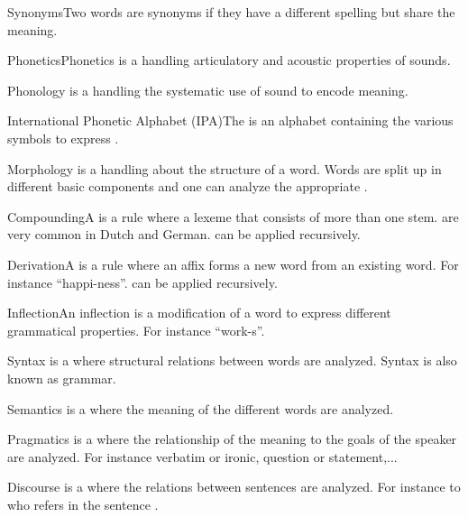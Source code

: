 \begin{df}{Synonyms}Two words are synonyms if they have a different spelling but share the meaning.
\end{df}
\begin{df}{Phonetics}Phonetics is a \alnlp{} handling articulatory and acoustic properties of sounds.
\end{df}
\begin{df}{Phonology}\sb{} is a \alnlp{} handling the systematic use of sound to encode meaning.
\end{df}
\begin{df}{International Phonetic Alphabet (IPA)}The \sb{} is an alphabet containing the various symbols to express \pnc{}.
\end{df}
\begin{df}{Morphology}\sb{} is a \alnlp{} handling about the structure of a word. Words are split up in different basic components and one can analyze the appropriate \pos{}.
\end{df}
\begin{df}{Compounding}A \sb{} is a \mpcl{} rule where a lexeme that consists of more than one stem. \sb{} are very common in Dutch and German. \sb{} can be applied recursively.
\end{df}
\begin{df}{Derivation}A \sb{} is a \mpcl{} rule where an affix forms a new word from an existing word. For instance ``happi-ness''. \sb{} can be applied recursively.
\end{df}
\begin{df}{Inflection}An inflection is a modification of a word to express different grammatical properties. For instance ``work-s''.
\end{df}
\begin{df}{Syntax}\sb{} is a \alnlp{} where structural relations between words are analyzed. Syntax is also known as grammar.
\end{df}
\begin{df}{Semantics}\sb{} is a \alnlp{} where the meaning of the different words are analyzed.
\end{df}
\begin{df}{Pragmatics}\sb{} is a \alnlp{} where the relationship of the meaning to the goals of the speaker are analyzed. For instance verbatim or ironic, question or statement,...
\end{df}
\begin{df}{Discourse}\sb{} is a \alnlp{} where the relations between sentences are analyzed. For instance to who refers  in the sentence .
\end{df}
